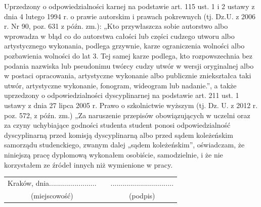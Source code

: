 \documentclass{article}
\begin{document}


\sectionfont{\LARGE}
\subsectionfont{\Large}
\subsubsectionfont{\large}

    \newpage
    {
        \Large
        \justifying
        Uprzedzony o odpowiedzialności karnej na podstawie art. 115 ust. 1 i 2 ustawy z dnia 4 lutego
        1994 r. o prawie autorskim i prawach pokrewnych (tj. Dz.U. z 2006 r. Nr 90, poz. 631 z późn.
        zm.): „Kto przywłaszcza sobie autorstwo albo wprowadza w błąd co do autorstwa całości lub
        części cudzego utworu albo artystycznego wykonania, podlega grzywnie, karze ograniczenia
        wolności albo pozbawienia wolności do lat 3. Tej samej karze podlega, kto rozpowszechnia bez
        podania nazwiska lub pseudonimu twórcy cudzy utwór w wersji oryginalnej albo w postaci
        opracowania, artystyczne wykonanie albo publicznie zniekształca taki utwór, artystyczne
        wykonanie, fonogram, wideogram lub nadanie.”, a także uprzedzony o odpowiedzialności
        dyscyplinarnej na podstawie art. 211 ust. 1 ustawy z dnia 27 lipca 2005 r. Prawo o szkolnictwie
        wyższym (tj. Dz. U. z 2012 r. poz. 572, z późn. zm.) „Za naruszenie przepisów obowiązujących
        w uczelni oraz za czyny uchybiające godności studenta student ponosi odpowiedzialność
        dyscyplinarną przed komisją dyscyplinarną albo przed sądem koleżeńskim samorządu
        studenckiego, zwanym dalej „sądem koleżeńskim”, oświadczam, że niniejszą pracę
        dyplomową wykonałem osobiście, samodzielnie, i że nie korzystałem ze źródeł innych niż
        wymienione w pracy.
    }

    \vfill

    \begin{center}
        {
            \Large
            \setlength{\tabcolsep}{2em}
            \begin{tabulary}{0.75\textwidth}{ c c c }
                Kraków, dnia........................ && ................................\\
                (miejscowość)& & (podpis)\\
            \end{tabulary}
        }
    \end{center}
    
    \newpage
    \begin{center}
        {
            \Large
            \tableofcontents
        }
    \end{center}
    \newpage
    
\end{document}
